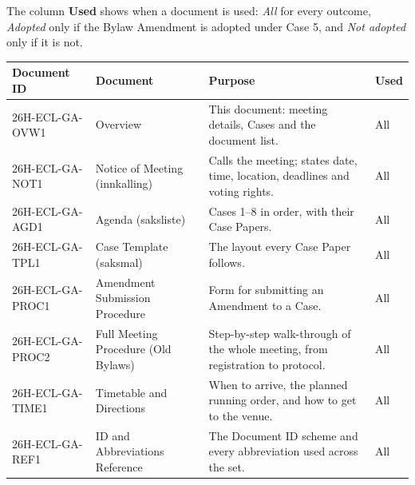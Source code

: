 \documentclass{../../../Common/Latex/Templates/rapport}
\begin{document}
The column \textbf{Used} shows when a document is used: \emph{All} for every outcome, \emph{Adopted} only if the Bylaw Amendment is adopted under Case 5, and \emph{Not adopted} only if it is not.

\begingroup
\small
\renewcommand{\arraystretch}{1.3}
\begin{longtable}{|L{3.2cm}|L{3.6cm}|L{5.3cm}|L{1.9cm}|}
  \hline
  \textbf{Document ID} & \textbf{Document}                          & \textbf{Purpose}                                                                                                             & \textbf{Used} \\
  \hline
  \endhead
  26H-ECL-GA-OVW1      & Overview                                   & This document: meeting details, Cases and the document list.                                                                 & All           \\
  \hline
  26H-ECL-GA-NOT1      & Notice of Meeting (innkalling)             & Calls the meeting; states date, time, location, deadlines and voting rights.                                                 & All           \\
  \hline
  26H-ECL-GA-AGD1      & Agenda (saksliste)                         & Cases 1--8 in order, with their Case Papers.                                                                                 & All           \\
  \hline
  26H-ECL-GA-TPL1      & Case Template (saksmal)                    & The layout every Case Paper follows.                                                                                         & All           \\
  \hline
  26H-ECL-GA-PROC1     & Amendment Submission Procedure             & Form for submitting an Amendment to a Case.                                                                                  & All           \\
  \hline
  26H-ECL-GA-PROC2     & Full Meeting Procedure (Old Bylaws)        & Step-by-step walk-through of the whole meeting, from registration to protocol.                                               & All           \\
  \hline
  26H-ECL-GA-TIME1     & Timetable and Directions                   & When to arrive, the planned running order, and how to get to the venue.                                                      & All           \\
  \hline
  26H-ECL-GA-REF1      & ID and Abbreviations Reference             & The Document ID scheme and every abbreviation used across the set.                                                           & All           \\

\end{longtable}
\end{document}
